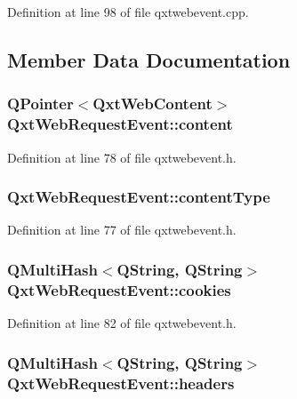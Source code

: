Definition at line 98 of file qxtwebevent.\-cpp.



\subsection{Member Data Documentation}
\hypertarget{class_qxt_web_request_event_ac6bc9d31ef80c6e739c0859b994bc950}{
\subsubsection[{content}]{\setlength{\rightskip}{0pt plus 5cm}Q\-Pointer$<${\bf Qxt\-Web\-Content}$>$ Qxt\-Web\-Request\-Event\-::content}}\label{class_qxt_web_request_event_ac6bc9d31ef80c6e739c0859b994bc950}


Definition at line 78 of file qxtwebevent.\-h.

\hypertarget{class_qxt_web_request_event_a7be4586ea32c7e6a968f824f4618bdd7}{
\subsubsection[{content\-Type}]{ Qxt\-Web\-Request\-Event\-::content\-Type}}\label{class_qxt_web_request_event_a7be4586ea32c7e6a968f824f4618bdd7}


Definition at line 77 of file qxtwebevent.\-h.

\hypertarget{class_qxt_web_request_event_afa70604b2da01c5d6f00d0d6b0214599}{
\subsubsection[{cookies}]{\setlength{\rightskip}{0pt plus 5cm}Q\-Multi\-Hash$<${\bf Q\-String}, {\bf Q\-String}$>$ Qxt\-Web\-Request\-Event\-::cookies}}\label{class_qxt_web_request_event_afa70604b2da01c5d6f00d0d6b0214599}


Definition at line 82 of file qxtwebevent.\-h.

\hypertarget{class_qxt_web_request_event_aa8beef38086e9b74c1bedb238d80d0fe}{
\subsubsection[{headers}]{\setlength{\rightskip}{0pt plus 5cm}Q\-Multi\-Hash$<${\bf Q\-String}, {\bf Q\-String}$>$ Qxt\-Web\-Request\-Event\-::headers}}\label{class_qxt_web_request_event_aa8beef38086e9b74c1bedb238d80d0fe}


